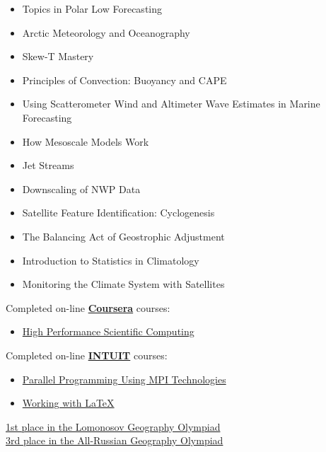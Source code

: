 \documentclass[a4paper,11pt]{article}
\begin{document}
\begin{small}
\begin{itemize}
        \item Topics in Polar Low Forecasting
        \item Arctic Meteorology and Oceanography
        \item Skew-T Mastery
        \item Principles of Convection: Buoyancy and CAPE
        \item Using Scatterometer Wind and Altimeter Wave Estimates in Marine Forecasting
        \item How Mesoscale Models Work
        \item Jet Streams
        \item Downscaling of NWP Data
        \item Satellite Feature Identification: Cyclogenesis
        \item The Balancing Act of Geostrophic Adjustment
        \item Introduction to Statistics in Climatology
        \item Monitoring the Climate System with Satellites
\end{itemize}
\end{small}

\vspace{.1in}
Completed on-line \textbf{\href{https://www.coursera.org}{Coursera}} courses:
\begin{itemize}
        \item {\href{https://www.coursera.org/course/scicomp}{High Performance Scientific Computing}}
\end{itemize}

\vspace{.1in}
Completed on-line \textbf{\href{http://www.intuit.ru/en/node/32/}{INTUIT}} courses:
\begin{itemize}
        \item {\href{http://www.intuit.ru/sites/default/files/diploma/d/e/n/n/i/NOU__INTUIT_-2-699590-OLF.jpg}{Parallel Programming Using MPI Technologies}}
        \item {\href{http://www.intuit.ru/sites/default/files/diploma/d/e/n/n/i/Nekommercheskoe_obrazovatelnoe_chastnoe_uchrejdenie_vyisshego_professionalnogo__obrazovaniya__Natsionalnyiy_otkryityiy_universitet__INTUIT_-2-790692-OLF.jpg}{Working with LaTeX}}
\end{itemize}

\vspace{.1in}
\href{http://lomonosov.msu.ru/}{1st place in the Lomonosov Geography Olympiad} \\
\href{http://rosolymp.ru/index.php?option=com_content&view=article&id=6455&Itemid=917}{3rd place in the All-Russian Geography Olympiad}
\end{document}
